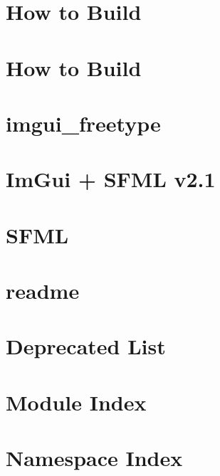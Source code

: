 \let\mypdfximage\pdfximage\def\pdfximage{\immediate\mypdfximage}\documentclass[twoside]{book}
\newcommand{\+}{\discretionary{\mbox{\scriptsize$\hookleftarrow$}}{}{}}
\begin{document}
\chapter{How to Build}
\label{md_deps_imgui_examples_example_sdl_opengl2__r_e_a_d_m_e}

\chapter{How to Build}
\label{md_deps_imgui_examples_example_sdl_opengl3__r_e_a_d_m_e}

\chapter{imgui\+\_\+freetype}
\label{md_deps_imgui_misc_freetype__r_e_a_d_m_e}

\chapter{Im\+Gui + S\+F\+ML v2.1}
\label{md_deps_imgui-sfml__r_e_a_d_m_e}

\chapter{S\+F\+ML}
\label{md_deps__s_f_m_l_share__s_f_m_l_license}

\chapter{readme}
\label{md_deps__s_f_m_l_share__s_f_m_l_readme}

\chapter{Deprecated List}
\label{deprecated}

\chapter{Module Index}

\chapter{Namespace Index}

\end{document}
